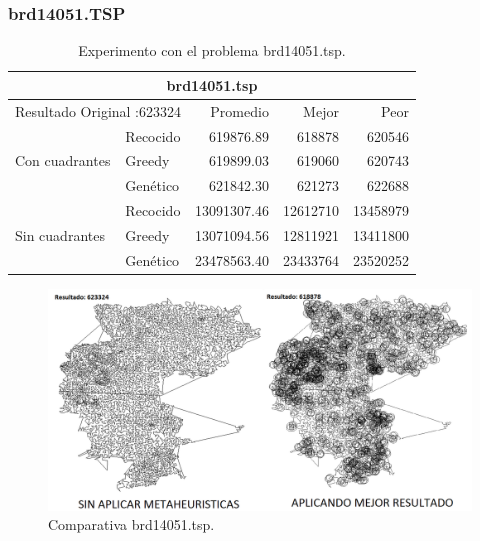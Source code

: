 \subsubsection{brd14051.TSP}
\begin{table}[hbtp]
    \centering 
    \caption{Experimento con el problema brd14051.tsp.}    
	\begin{tabular}{ | l   l | r | r | r |   }
    \hline\multicolumn{5}{|c|}{ \rowcolor[gray]{0.8}brd14051.tsp} \\\hline
    \multicolumn{2}{|l|}{Resultado Original :623324}  & Promedio & Mejor & Peor \\ 
                \hline
                & Recocido  & \cellcolor[gray]{0.9} 619876.89 & \cellcolor[gray]{0.9} 618878 & \cellcolor[gray]{0.9} 620546 \\ 
 Con cuadrantes & Greedy    & 619899.03 & 619060 & 620743  \\ 
                & Genético  & 621842.30 & 621273 & 622688  \\ 
                \hline
                & Recocido  & 13091307.46 & \cellcolor[gray]{0.9} 12612710 & 13458979 \\ 
 Sin cuadrantes & Greedy    & \cellcolor[gray]{0.9} 13071094.56 & 12811921 & \cellcolor[gray]{0.9} 13411800 \\ 
                & Genético  & 23478563.40 & 23433764 & 23520252 \\ 
                \hline
    \end{tabular}
    \label{table:EXP_brd14051.tsp}
\end{table}
\begin{figure}[hbtp]
    \centering
        \includegraphics[width=1\textwidth]{PruebasResultados/Experimentos_Comparativas/brd14051.png}
        \caption{Comparativa brd14051.tsp.}
        \label{fig:brd14051_comparativa.png}
\end{figure}

